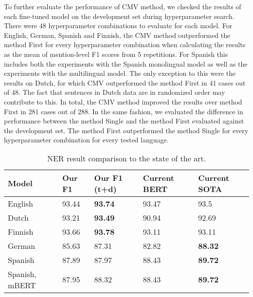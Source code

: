 To further evaluate the performance of CMV method, we checked the results of each fine-tuned model on the development set during hyperparameter search. There were 48 hyperparameter combinations to evaluate for each model. For English, German, Spanish and Finnish, the CMV method outperformed the method First for every hyperparameter combination when calculating the results as the mean of mention-level F1 scores from 5 repetitions. For Spanish this includes both the experiments with the Spanish monolingual model as well as the experiments with the multilingual model. The only exception to this were the results on Dutch, for which CMV outperformed the method First in 41 cases out of 48. The fact that sentences in Dutch data are in randomized order may contribute to this. In total, the CMV method improved the results over method First in 281 cases out of 288.
In the same fashion, we evaluated the difference in performance between the method Single and the method First evaluated against the development set. The method First outperformed the method Single for every hyperparameter combination for every tested language. 

\begin{table}[t!]
\small
\centering
\begin{tabular}{l|llll}
Model         & Our F1 &  Our F1 (t+d) & Current BERT & Current SOTA    \\ \hline
English   & 93.44 & \textbf{93.74} & 93.47 \cite{Liu_2019} & 93.5 \cite{Baevski_2019}\\ \hline
Dutch   & 93.21 & \textbf{93.49} & 90.94 \cite{Wu_2019} & 92.69 \cite{strakova-etal-2019-neural}\\ \hline
Finnish        &  93.66 &  \textbf{93.78} & 93.11 \cite{luoma-EtAl:2020:LREC} & 93.11 \cite{luoma-EtAl:2020:LREC} \\ \hline
German  &  85.63 & 87.31 & 82.82 \cite{Wu_2019} & \textbf{88.32} \cite{akbik2018coling} \\ \hline
Spanish   & 87.89 & 87.97 & 88.43 \cite{CaneteCFP2020} & \textbf{89.72} \cite{conneau-etal-2020-unsupervised} \\ \hline
Spanish, mBERT   & 87.95 & 88.32 & 88.43 \cite{CaneteCFP2020} & \textbf{89.72} \cite{conneau-etal-2020-unsupervised} \\ \hline
\end{tabular}
\caption{NER result comparison to the state of the art.}
\label{ner-sota2}
\end{table}

